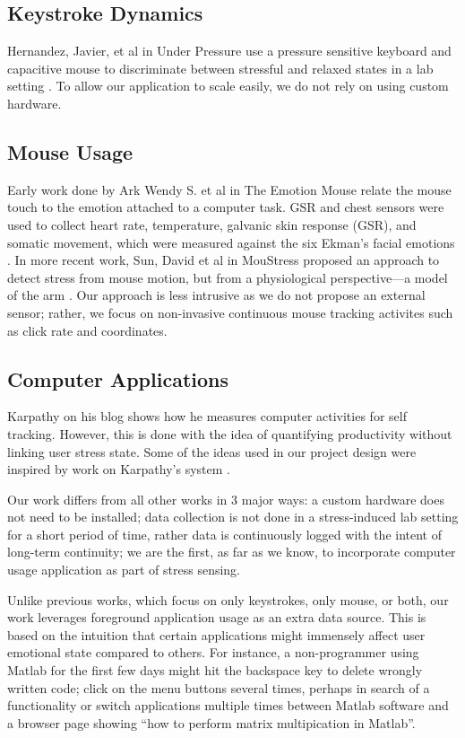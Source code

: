 \documentclass{article}
\begin{document}
\subsection{Keystroke Dynamics}
Hernandez, Javier, et al in Under Pressure use a pressure sensitive keyboard and capacitive mouse to discriminate between stressful and relaxed states in a lab setting \cite{hernandez2014under}. To allow our application to scale easily, we do not rely on using custom hardware.

\subsection{Mouse Usage}
Early work done by Ark Wendy S. et al in The Emotion Mouse relate the mouse touch to the emotion attached to a computer task. GSR and chest sensors were used to collect heart rate, temperature, galvanic skin response (GSR), and somatic movement, which were measured against the six Ekman’s facial emotions \cite{ark1999emotion}. In more recent work, Sun, David et al in MouStress proposed an approach to detect stress from mouse motion, but from a physiological perspective---a model of the arm \cite{sun2014moustress}. Our approach is less intrusive as we do not propose an external sensor; rather, we focus on  non-invasive continuous mouse tracking activites such as click rate and coordinates.

\subsection{Computer Applications}
Karpathy on his blog shows how he measures computer activities for self tracking. However, this is done with the idea of quantifying productivity without linking user stress state. Some of the ideas used in our project design were inspired by work on Karpathy's system \cite{karpathy}.

Our work differs from all other works in 3 major ways: a custom hardware does not need to be installed; data collection is not done in a stress-induced lab setting for a short period of time, rather data is continuously logged with the intent of long-term continuity; we are the first, as far as we know, to incorporate computer usage application as part of stress sensing. 

Unlike previous works, which focus on only keystrokes, only mouse, or both, our work leverages foreground application usage as an extra data source. This is based on the intuition that certain applications might immensely affect user emotional state compared to others. For instance, a non-programmer using Matlab for the first few days might hit the backspace key to delete wrongly written code; click on the menu buttons several times, perhaps in search of a functionality or switch applications multiple times between Matlab software and a browser page showing ``how to perform matrix multipication in Matlab''.
\end{document}
